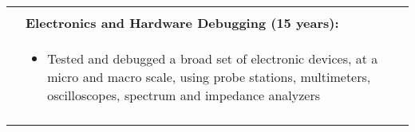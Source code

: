 \begin{tabular}{L{\hlcolw}  L{\rcolw}}
\begin{itemize}[leftmargin = \itemmargin]
	\end{itemize} 
	\\

	& \textbf{Electronics and Hardware Debugging (15 years):} \\
	&
	\vspace{-0.25in}
	\begin{itemize}[leftmargin = \itemmargin]
		\item Tested and debugged a broad set of electronic devices, at a micro and macro scale, using probe stations, multimeters, oscilloscopes, spectrum and impedance analyzers
	\end{itemize}
	\\

	\hline \\
\end{tabular}